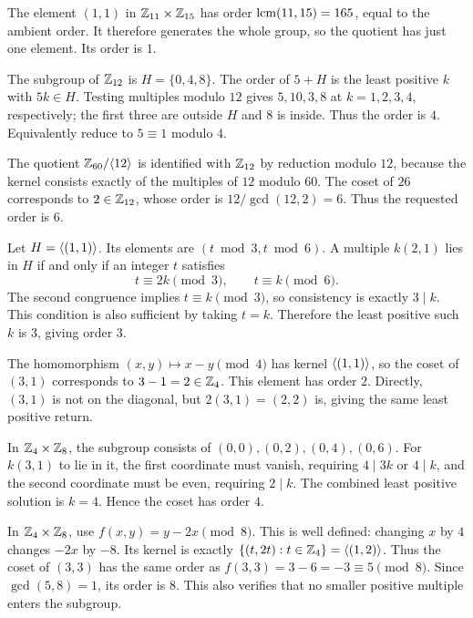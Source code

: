 The element $(1,1)$ in $\mathbb{Z}_{11}\times\mathbb{Z}_{15}$ has order $\operatorname{lcm}(11,15)=165$, equal to the ambient order. It therefore generates the whole group, so the quotient has just one element. Its order is $1$.

The subgroup of $\mathbb{Z}_{12}$ is $H=\{0,4,8\}$. The order of $5+H$ is the least positive $k$ with $5k\in H$. Testing multiples modulo $12$ gives $5,10,3,8$ at $k=1,2,3,4$, respectively; the first three are outside $H$ and $8$ is inside. Thus the order is $4$. Equivalently reduce to $5\equiv1$ modulo $4$.

The quotient $\mathbb{Z}_{60}/\langle 12\rangle$ is identified with $\mathbb{Z}_{12}$ by reduction modulo $12$, because the kernel consists exactly of the multiples of $12$ modulo $60$. The coset of $26$ corresponds to $2\in\mathbb{Z}_{12}$, whose order is $12/\gcd(12,2)=6$. Thus the requested order is $6$.

Let $H=\langle (1,1)\rangle$. Its elements are $(t\bmod3,t\bmod6)$. A multiple $k(2,1)$ lies in $H$ if and only if an integer $t$ satisfies
\[t\equiv2k\pmod3,\qquad t\equiv k\pmod6.\]
The second congruence implies $t\equiv k\pmod3$, so consistency is exactly $3\mid k$. This condition is also sufficient by taking $t=k$. Therefore the least positive such $k$ is $3$, giving order $3$.

The homomorphism $(x,y)\mapsto x-y\pmod4$ has kernel $\langle (1,1)\rangle$, so the coset of $(3,1)$ corresponds to $3-1=2\in\mathbb{Z}_4$. This element has order $2$. Directly, $(3,1)$ is not on the diagonal, but $2(3,1)=(2,2)$ is, giving the same least positive return.

In $\mathbb{Z}_4\times\mathbb{Z}_8$, the subgroup consists of $(0,0),(0,2),(0,4),(0,6)$. For $k(3,1)$ to lie in it, the first coordinate must vanish, requiring $4\mid3k$ or $4\mid k$, and the second coordinate must be even, requiring $2\mid k$. The combined least positive solution is $k=4$. Hence the coset has order $4$.

In $\mathbb{Z}_4\times\mathbb{Z}_8$, use $f(x,y)=y-2x\pmod8$. This is well defined: changing $x$ by $4$ changes $-2x$ by $-8$. Its kernel is exactly $\{(t,2t):t\in\mathbb{Z}_4\}=\langle (1,2)\rangle$. Thus the coset of $(3,3)$ has the same order as $f(3,3)=3-6=-3\equiv5\pmod8$. Since $\gcd(5,8)=1$, its order is $8$. This also verifies that no smaller positive multiple enters the subgroup.


